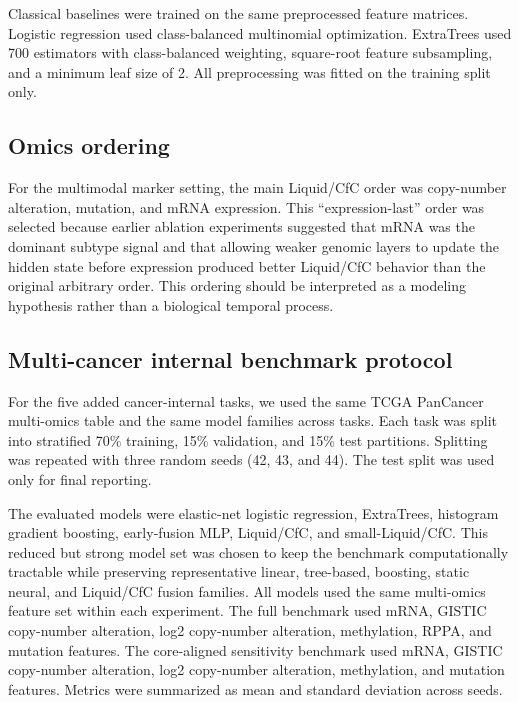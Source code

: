 Classical baselines were trained on the same preprocessed feature matrices. Logistic regression used class-balanced multinomial optimization. ExtraTrees used 700 estimators with class-balanced weighting, square-root feature subsampling, and a minimum leaf size of 2. All preprocessing was fitted on the training split only.

\subsection{Omics ordering}

For the multimodal marker setting, the main Liquid/CfC order was copy-number alteration, mutation, and mRNA expression. This ``expression-last'' order was selected because earlier ablation experiments suggested that mRNA was the dominant subtype signal and that allowing weaker genomic layers to update the hidden state before expression produced better Liquid/CfC behavior than the original arbitrary order. This ordering should be interpreted as a modeling hypothesis rather than a biological temporal process.

\subsection{Multi-cancer internal benchmark protocol}

For the five added cancer-internal tasks, we used the same TCGA PanCancer multi-omics table and the same model families across tasks. Each task was split into stratified 70\% training, 15\% validation, and 15\% test partitions. Splitting was repeated with three random seeds (42, 43, and 44). The test split was used only for final reporting.

The evaluated models were elastic-net logistic regression, ExtraTrees, histogram gradient boosting, early-fusion MLP, Liquid/CfC, and small-Liquid/CfC. This reduced but strong model set was chosen to keep the benchmark computationally tractable while preserving representative linear, tree-based, boosting, static neural, and Liquid/CfC fusion families. All models used the same multi-omics feature set within each experiment. The full benchmark used mRNA, GISTIC copy-number alteration, log2 copy-number alteration, methylation, RPPA, and mutation features. The core-aligned sensitivity benchmark used mRNA, GISTIC copy-number alteration, log2 copy-number alteration, methylation, and mutation features. Metrics were summarized as mean and standard deviation across seeds.

